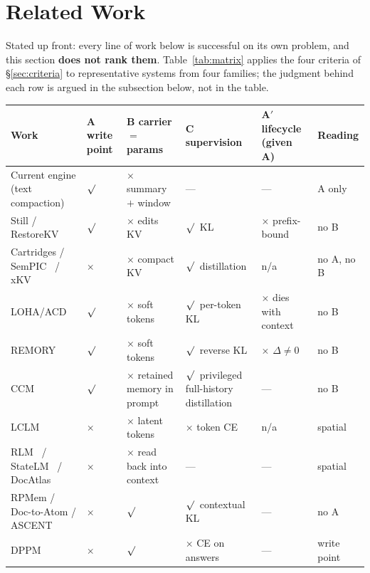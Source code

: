 \documentclass[sigconf,nonacm]{acmart}
\providecommand{\checkmark}{\ensuremath{\surd}}
\begin{document}
\section{Related Work}\label{sec:related}

Stated up front: every line of work below is successful on its own problem, and this section
\textbf{does not rank them}. Table~\ref{tab:matrix} applies the four criteria of \S\ref{sec:criteria} to
representative systems from four families; the judgment behind each row is argued in the subsection below,
not in the table.

\begin{table}[t]
\centering
\footnotesize
\setlength{\tabcolsep}{4pt}
\begin{tabularx}{\textwidth}{@{}>{\raggedright\arraybackslash}p{3.6cm}>{\raggedright\arraybackslash}p{1.3cm}>{\raggedright\arraybackslash}X>{\raggedright\arraybackslash}X>{\raggedright\arraybackslash}p{1.9cm}>{\raggedright\arraybackslash}p{1.6cm}@{}}
\toprule
Work & A write point & B carrier $=$ params & C supervision & A$'$ lifecycle (given A) & Reading \\
\midrule
Current engine (text compaction) & \checkmark & $\times$ summary $+$ window & --- & --- & A only \\
Still / RestoreKV & \checkmark & $\times$ edits KV & \checkmark\ KL & $\times$ prefix-bound & no B \\
Cartridges / SemPIC~\cite{sempic2026} / xKV~\cite{xkv2025} & $\times$ & $\times$ compact KV & \checkmark\ distillation & n/a & no A, no B \\
LOHA/ACD & \checkmark & $\times$ soft tokens & \checkmark\ per-token KL & $\times$ dies with context & no B \\
REMORY & \checkmark & $\times$ soft tokens & \checkmark\ reverse KL & $\times$ $\Delta{\neq}0$ & no B \\
CCM~\cite{ccm} & \checkmark & $\times$ retained memory in prompt & \checkmark\ privileged full-history distillation & --- & no B \\
LCLM~\cite{lclm2026} & $\times$ & $\times$ latent tokens & $\times$ token CE & n/a & spatial \\
RLM~\cite{rlm2025} / StateLM~\cite{statelm2026} / DocAtlas~\cite{docatlas2026} & $\times$ & $\times$ read back into context & --- & --- & spatial \\
RPMem / Doc-to-Atom / ASCENT~\cite{ascent2026} & $\times$ & \checkmark & \checkmark\ contextual KL & --- & no A \\
DPPM & $\times$ & \checkmark & $\times$ CE on answers & --- & write point \\

\end{tabularx}
\end{table}
\end{document}
